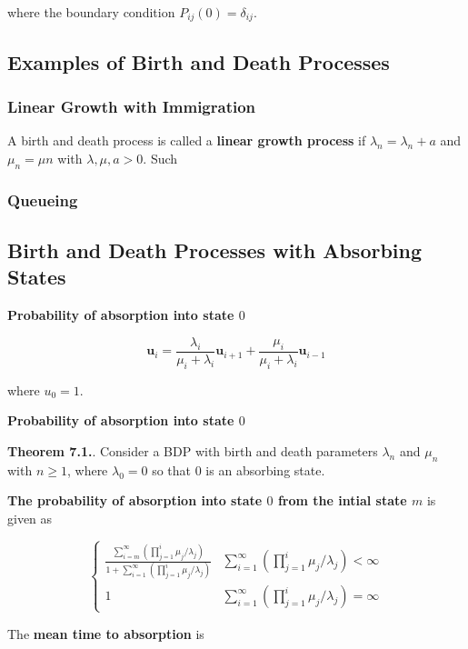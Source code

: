 \documentclass[12pt]{article}
\theoremstyle{nonumberbreak}
\begin{document}
where the boundary condition $P_{ij}(0) = \delta_{ij}$. 



\subsection{Examples of Birth and Death Processes}

\subsubsection{Linear Growth with Immigration}

A birth and death process is called a \textbf{linear growth process} if $\lambda_n = \lambda_n + a$ and $\mu_n = \mu n$ with $\lambda, \mu, a >0$. Such 







\subsubsection{Queueing}





\subsection{Birth and Death Processes with Absorbing States}

\textbf{Probability of absorption into state $0$}


$$
\mathbf{u}_i = \frac{\lambda_i}{\mu_i + \lambda_i} \mathbf{u}_{i+1}  + \frac{\mu_i}{\mu_i + \lambda_i} \mathbf{u}_{i-1}
$$

where $u_0 = 1$. 


\textbf{Probability of absorption into state $0$}



\begin{theorem}
\textbf{Theorem 7.1.}. Consider a BDP with birth and death parameters $\lambda_n$ and $\mu_n$ with $n \ge 1$, where $\lambda_0 = 0$ so that $0$ is an absorbing state. 

\textbf{The probability of absorption into state $0$ from the intial state $m$} is given as 

$$
\begin{cases}
\frac{ \sum_{i=m}^\infty \left( \prod_{j=1}^i \mu_j/\lambda_j \right)  }{ 1+ \sum_{i=1}^\infty \left( \prod_{j=1}^i \mu_j/\lambda_j \right)} & \sum_{i=1}^\infty \left( \prod_{j=1}^i \mu_j/\lambda_j \right) < \infty \\
1 & \sum_{i=1}^\infty \left( \prod_{j=1}^i \mu_j/\lambda_j \right) = \infty
\end{cases}
$$

The \textbf{mean time to absorption} is



\end{theorem}
\end{document}
